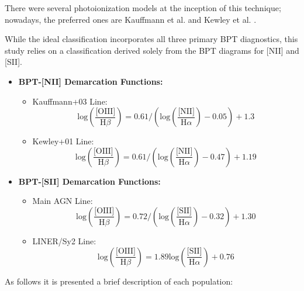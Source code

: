 There were several photoionization models at the inception of this technique; nowadays, the preferred ones are Kauffmann et al. \cite{2003MNRAS.346.1055K} and Kewley et al. \cite{2001ApJ...556..121K}.

While the ideal classification incorporates all three primary BPT diagnostics, this study relies on a classification derived solely from the BPT diagrams for [NII] and [SII].

\begin{itemize}
    \item \textbf{BPT-[NII] Demarcation Functions:}
    \begin{itemize}
        \item Kauffmann+03 Line: \[ \text{log}(\frac{\text{[OIII]}}{\text{H}\beta}) = 0.61 / (\text{log}(\frac{\text{[NII]}}{\text{H}\alpha}) - 0.05) + 1.3 \]
        \item Kewley+01 Line: \[ \text{log}(\frac{\text{[OIII]}}{\text{H}\beta}) = 0.61 / (\text{log}(\frac{\text{[NII]}}{\text{H}\alpha}) - 0.47) + 1.19 \]
    \end{itemize}

    \item \textbf{BPT-[SII] Demarcation Functions:}
    \begin{itemize}
        \item Main AGN Line: \[ \text{log}(\frac{\text{[OIII]}}{\text{H}\beta}) = 0.72 / (\text{log}(\frac{\text{[SII]}}{\text{H}\alpha}) - 0.32) + 1.30 \]
        \item LINER/Sy2 Line: \[ \text{log}(\frac{\text{[OIII]}}{\text{H}\beta}) = 1.89 \text{log}(\frac{\text{[SII]}}{\text{H}\alpha}) + 0.76 \]
    \end{itemize}
\end{itemize}

As follows it is presented a brief description of each population:

